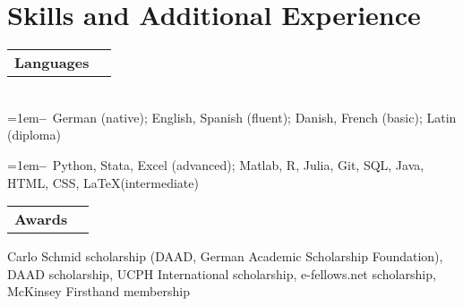 \documentclass[A4,11pt]{article}
\makeatletter
\newcommand{\Subheading}[4]{   
    \begin{tabular*}{\textwidth}[t]{@{}l @{\extracolsep{\fill}} r@{}}
        \textbf{#1}\textit{\small #2} & \footnotesize #3 \\
    \end{tabular*}
    \small #4 
    \vspace{7pt}
}
\newcommand{\myitem}[1]{\hangindent=1em\hangafter=1\textbf{--}~#1\par}
\makeatother
\begin{document}
\section{Skills and Additional Experience}

    \Subheading
        {Languages}{}{}
        {\\
        \myitem{German (native); English, Spanish (fluent); Danish, French (basic); Latin (diploma)}
        \myitem{Python, Stata, Excel (advanced); Matlab, R, Julia, Git, SQL, Java, HTML, CSS, \LaTeX\space(intermediate)}
        }
    

    \Subheading
        {Awards}{}{}
        {Carlo Schmid scholarship (DAAD, German Academic Scholarship Foundation), 
        DAAD scholarship, 
        UCPH International scholarship, 
        e-fellows.net scholarship, 
        McKinsey Firsthand membership
        } 



\vfill
{}
\end{document}
